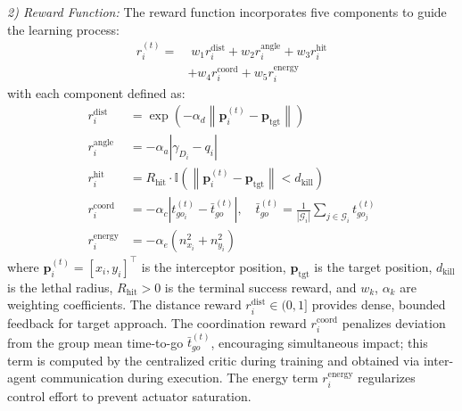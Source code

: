 \documentclass[lettersize,journal]{IEEEtran}
\begin{document}
\emph{2) Reward Function:} The reward function incorporates five components to guide the learning process:
\begin{equation}
\label{eq:reward_function}
\begin{split}
r_i^{(t)} =& \; w_1 r_i^{\text{dist}} + w_2 r_i^{\text{angle}} + w_3 r_i^{\text{hit}} \\
&+ w_4 r_i^{\text{coord}} + w_5 r_i^{\text{energy}}
\end{split}
\end{equation}
with each component defined as:
\begin{align}
r_i^{\text{dist}} &= \exp\!\left(-\alpha_d \left\|\mathbf{p}_i^{(t)} - \mathbf{p}_{\text{tgt}}\right\|\right) \label{eq:r_dist}\\
r_i^{\text{angle}} &= -\alpha_a \left|\gamma_{D_i} - q_i\right| \label{eq:r_angle}\\
r_i^{\text{hit}} &= R_{\text{hit}} \cdot \mathbb{I}\!\left(\left\|\mathbf{p}_i^{(t)} - \mathbf{p}_{\text{tgt}}\right\| < d_{\text{kill}}\right) \label{eq:r_hit}\\
r_i^{\text{coord}} &= -\alpha_c \left| t_{go_i}^{(t)} - \bar{t}_{go}^{(t)} \right|, \quad \bar{t}_{go}^{(t)} = \frac{1}{|\mathcal{G}_i|}\sum_{j \in \mathcal{G}_i} t_{go_j}^{(t)} \label{eq:r_coord}\\
r_i^{\text{energy}} &= -\alpha_e \left(n_{x_i}^2 + n_{y_i}^2\right) \label{eq:r_energy}
\end{align}
where $\mathbf{p}_i^{(t)} = [x_i, y_i]^\top$ is the interceptor position, $\mathbf{p}_{\text{tgt}}$ is the target position, $d_{\text{kill}}$ is the lethal radius, $R_{\text{hit}} > 0$ is the terminal success reward, and $w_k$, $\alpha_k$ are weighting coefficients. The distance reward $r_i^{\text{dist}} \in (0,1]$ provides dense, bounded feedback for target approach. The coordination reward $r_i^{\text{coord}}$ penalizes deviation from the group mean time-to-go $\bar{t}_{go}^{(t)}$, encouraging simultaneous impact; this term is computed by the centralized critic during training and obtained via inter-agent communication during execution. The energy term $r_i^{\text{energy}}$ regularizes control effort to prevent actuator saturation.
\end{document}
